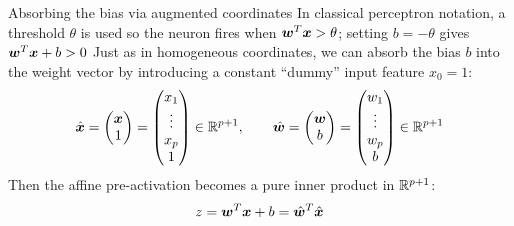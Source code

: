 \documentclass[aspectratio=169]{beamer}\usepackage[]{graphicx}\usepackage[]{xcolor}
\begin{document}
\begin{frame}{Absorbing the bias via augmented coordinates}
In classical perceptron notation, a threshold $\theta$ is used so the neuron fires when $\bm{w}^T \bm{x} > \theta$; setting $b = -\theta$ gives $\bm{w}^T \bm{x} + b > 0$
\vfill
Just as in homogeneous coordinates, we can absorb the bias $b$ into the weight vector by introducing a constant ``dummy'' input feature $x_0 = 1$:
\[
\hat{\bm{x}} = \begin{pmatrix} \bm{x} \\ 1 \end{pmatrix} = \begin{pmatrix} x_1 \\ \vdots \\ x_p \\ 1 \end{pmatrix} \in \mathbb{R}^{p+1}, \qquad
\hat{\bm{w}} = \begin{pmatrix} \bm{w} \\ b \end{pmatrix} = \begin{pmatrix} w_1 \\ \vdots \\ w_p \\ b \end{pmatrix} \in \mathbb{R}^{p+1}
\]
\vfill
Then the affine pre-activation becomes a pure inner product in $\mathbb{R}^{p+1}$:
\[
z = \bm{w}^T \bm{x} + b = \hat{\bm{w}}^T \hat{\bm{x}}
\]
\end{frame}
\end{document}
